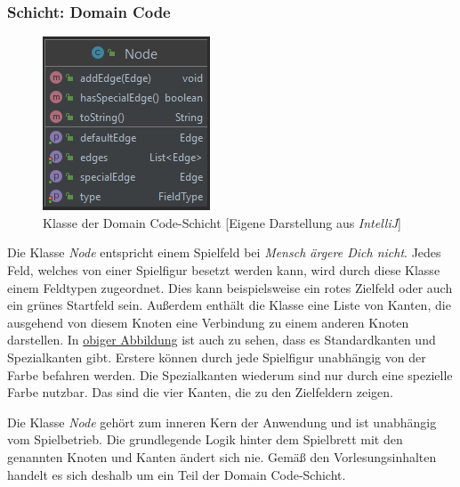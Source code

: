 \subsubsection{Schicht: Domain Code}
\begin{figure}[htbp]
\centering
\centerline{\includegraphics[scale=.7]{node}}
\caption{Klasse der Domain Code-Schicht [Eigene Darstellung aus \emph{IntelliJ}]}
\label{fig:klassedomaincodeschicht}
\end{figure}
\noindent Die Klasse \emph{Node} entspricht einem Spielfeld bei \emph{Mensch ärgere Dich nicht}. Jedes Feld, welches von einer Spielfigur besetzt werden kann, wird durch diese Klasse einem Feldtypen zugeordnet. Dies kann beispielsweise ein rotes Zielfeld oder auch ein grünes Startfeld sein. Außerdem enthält die Klasse eine Liste von Kanten, die ausgehend von diesem Knoten eine Verbindung zu einem anderen Knoten darstellen. In \hyperref[fig:klasseadomaincodeschicht]{obiger Abbildung} ist auch zu sehen, dass es Standardkanten und Spezialkanten gibt. Erstere können durch jede Spielfigur unabhängig von der Farbe befahren werden. Die Spezialkanten wiederum sind nur durch eine spezielle Farbe nutzbar. Das sind die vier Kanten, die zu den Zielfeldern zeigen.

Die Klasse \emph{Node} gehört zum inneren Kern der Anwendung und ist unabhängig vom Spielbetrieb. Die grundlegende Logik hinter dem Spielbrett mit den genannten Knoten und Kanten ändert sich nie. Gemäß den Vorlesungsinhalten handelt es sich deshalb um ein Teil der Domain Code-Schicht.
\newpage
